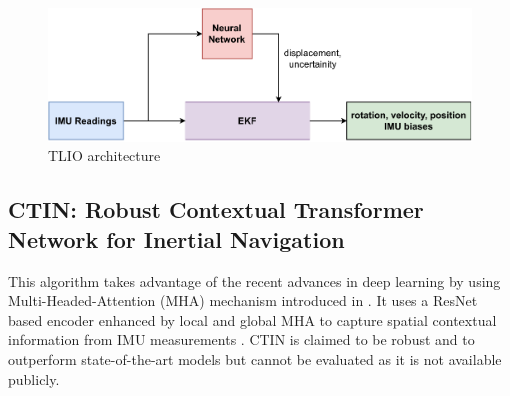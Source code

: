 \begin{figure}[H]
    \centering
    \includegraphics[scale=0.8]{images/fig_chapter3/tlio.pdf}
    \caption{TLIO architecture}
    \label{fig:tlio}
\end{figure}

\subsection{CTIN: Robust Contextual Transformer Network for Inertial Navigation}
This algorithm takes advantage of the recent advances in deep learning by using Multi-Headed-Attention (MHA) mechanism introduced in \citep{vaswani2017attention}. It uses a ResNet based encoder enhanced by local and global MHA to capture spatial contextual information from IMU measurements \citep{rao2022ctin}. CTIN is claimed to be robust and to outperform state-of-the-art models but cannot be evaluated as it is not available publicly.




